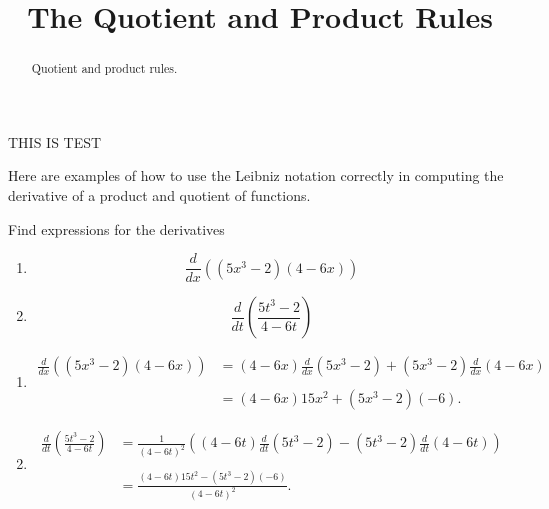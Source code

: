 \documentclass{ximera}
\title{The Quotient and Product Rules}
\begin{document}
\begin{abstract}
Quotient and product rules.
\end{abstract}
\maketitle

THIS IS TEST

Here are examples of how to use the Leibniz notation correctly in computing the derivative of a product and quotient of functions.

\begin{example} \label{Edfhnhhthgg}

Find expressions for the derivatives



\begin{enumerate}

\item 
\[
   \frac{d}{dx} \left( (5x^3-2)(4 - 6x)  \right)
\]

\item 
\[
  \frac{d}{dt} \left( \frac{5t^3-2}{4 - 6t}  \right)
\]
\end{enumerate}

\begin{explanation}
\begin{enumerate}

\item 
\begin{align*}
\frac{d}{dx} \left( (5x^3-2)(4 - 6x)  \right)  &= (4-6x)\frac{d}{dx} \left( 5x^3-2 \right) + (5x^3-2)   \frac{d}{dx} \left( 4-6x \right)    \\ \\
              &= (4-6x) 15x^2+ (5x^3-2) (-6) .
\end{align*}

\item 

\begin{align*}
\frac{d}{dt} \left( \frac{5t^3-2}{4 - 6t}  \right)  &=\frac{1}{(4-6t)^2} \left( (4-6t) \frac{d}{dt} \left( 5t^3-2 \right)  - (5t^3-2)   \frac{d}{dt} \left( 4-6t \right)   \right)  \\ \\
              &= \frac{(4-6t) 15t^2 - (5t^3-2) (-6)}{(4-6t)^2} .
\end{align*}


\end{enumerate}

\end{explanation}

\end{example}
\end{document}
